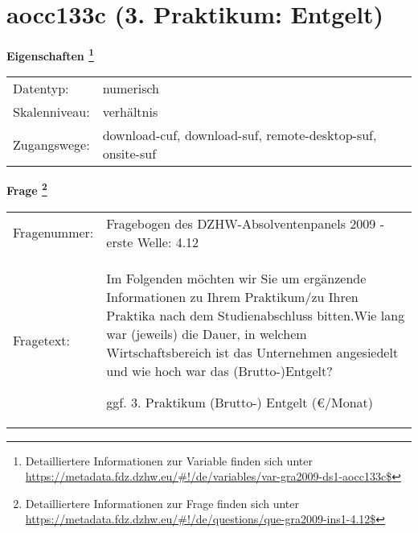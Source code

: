 
    \setcounter{footnote}{0}

    \vspace*{-1.8cm}
	\section{aocc133c (3. Praktikum: Entgelt)}
	\label{section:aocc133c}



    \vspace*{0.5cm}
    \noindent\textbf{Eigenschaften
	\footnote{Detailliertere Informationen zur Variable finden sich unter
		\url{https://metadata.fdz.dzhw.eu/\#!/de/variables/var-gra2009-ds1-aocc133c$}}}\\
	\begin{tabularx}{\hsize}{@{}lX}
	Datentyp: & numerisch \\
	Skalenniveau: & verhältnis \\
	Zugangswege: &
	  download-cuf, 
	  download-suf, 
	  remote-desktop-suf, 
	  onsite-suf
 \\
    \end{tabularx}



				\vspace*{0.5cm}
                \noindent\textbf{Frage
	                \footnote{Detailliertere Informationen zur Frage finden sich unter
		              \url{https://metadata.fdz.dzhw.eu/\#!/de/questions/que-gra2009-ins1-4.12$}}}\\
				\begin{tabularx}{\hsize}{@{}lX}
					Fragenummer: &
					  Fragebogen des DZHW-Absolventenpanels 2009 - erste Welle:
					  4.12
 \\
					Fragetext: & Im Folgenden möchten wir Sie um ergänzende Informationen zu Ihrem Praktikum/zu Ihren Praktika nach dem Studienabschluss bitten.Wie lang war (jeweils) die Dauer, in welchem Wirtschaftsbereich ist das Unternehmen angesiedelt und wie hoch war das (Brutto-)Entgelt?\par  ggf. 3. Praktikum (Brutto-) Entgelt (€/Monat) \\
				\end{tabularx}





